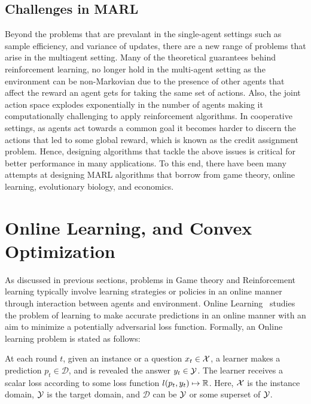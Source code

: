\subsection{Challenges in MARL}
Beyond the problems that are prevalant in the single-agent settings such as sample efficiency, and
variance of updates, there are a new range of problems that arise in the multiagent setting.
Many of the theoretical guarantees behind reinforcement learning, no longer hold in the multi-agent
setting as the environment can be non-Markovian due to the presence of other agents that affect the
reward an agent gets for taking the same set of actions.
Also, the joint action space explodes exponentially in the number of agents making it
computationally challenging to apply reinforcement algorithms.
In cooperative settings, as agents act towards a common goal it becomes harder to discern the
actions that led to some global reward, which is known as the credit assignment problem.
Hence, designing algorithms that tackle the above issues is critical for better performance in many
applications.
To this end, there have been many attempts at designing MARL algorithms that borrow from game
theory, online learning, evolutionary biology, and economics.

\section{Online Learning, and Convex Optimization}
As discussed in previous sections, problems in Game theory and Reinforcement learning typically
involve learning strategies or policies in an online manner through interaction between agents and
environment.
Online Learning~\cite{shalev-shwartzOnline2012} studies the problem of learning to make accurate
predictions in an online manner with an aim to minimize a potentially adversarial loss function.
Formally, an Online learning problem is stated as follows:

\begin{definition} 
	\label{def:olearning} 
	At each round $t$, given an instance or a question $x_t \in \mathcal{X}$, a learner makes a prediction $p_t \in \mathcal{D}$, 
	and is revealed the answer $y_t \in \mathcal{Y}$. The learner receives a scalar loss according to some loss function $l(p_t, y_t) \mapsto \mathbb{R}$. 
	Here, $\mathcal{X}$ is the instance domain, $\mathcal{Y}$ is the target domain, and $\mathcal{D}$ can be $\mathcal{Y}$ or some superset of $\mathcal{Y}$.
\end{definition}

